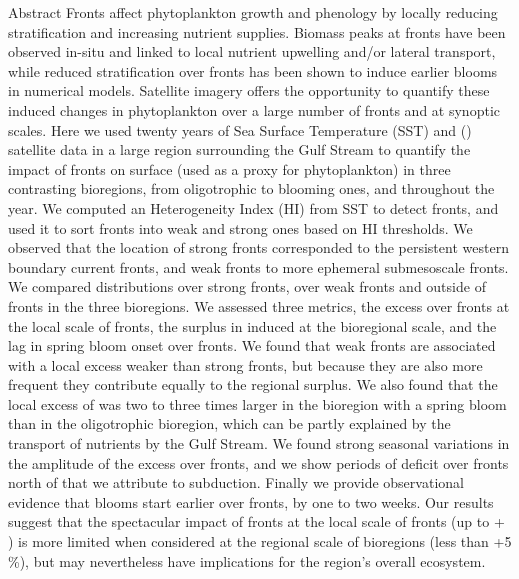 \begin{articleBlock}{Abstract}
  Fronts affect phytoplankton growth and phenology by locally reducing stratification and increasing nutrient supplies.
  Biomass peaks at fronts have been observed in-situ and linked to local nutrient upwelling and/or lateral transport, while reduced stratification over fronts has been shown to induce earlier blooms in numerical models.
  Satellite imagery offers the opportunity to quantify these induced changes in phytoplankton over a large number of fronts and at synoptic scales.
  Here we used twenty years of Sea Surface Temperature (SST) and  () satellite data in a large region surrounding the Gulf Stream to quantify the impact of fronts on surface  (used as a proxy for phytoplankton) in three contrasting bioregions, from oligotrophic to blooming ones, and throughout the year.
  We computed an Heterogeneity Index (HI) from SST to detect fronts, and used it to sort fronts into weak and strong ones based on HI thresholds.
  We observed that the location of strong fronts corresponded to the persistent western boundary current fronts, and weak fronts to more ephemeral submesoscale fronts.
  We compared  distributions over strong fronts, over weak fronts and outside of fronts in the three bioregions.
  We assessed three metrics, the  excess over fronts at the local scale of fronts, the surplus in  induced at the bioregional scale, and the lag in spring bloom onset over fronts.
  We found that weak fronts are associated with a local  excess weaker than strong fronts, but because they are also more frequent they contribute equally to the regional  surplus.
  We also found that the local excess of  was two to three times larger in the bioregion with a spring bloom than in the oligotrophic bioregion, which can be partly explained by the transport of nutrients by the Gulf Stream.
  We found strong seasonal variations in the amplitude of the  excess over fronts, and we show periods of  deficit over fronts north of  that we attribute to subduction.
  Finally we provide observational evidence that blooms start earlier over fronts, by one to two weeks.
  Our results suggest that the spectacular impact of fronts at the local scale of fronts (up to + ) is more limited when considered at the regional scale of bioregions (less than +5 \%), but may nevertheless have implications for the region's overall ecosystem.
\end{articleBlock}


